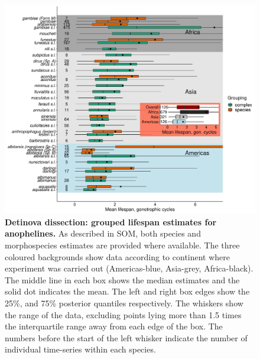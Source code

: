 \documentclass[12pt]{article}
\begin{document}
\begin{figure}[h]
	\centerline{\includegraphics[width=1\textwidth]{./Figure_files/detinova_lifespans_combined_parity_no_insecticide.pdf}}
	\caption{\textbf{Detinova dissection: grouped lifespan estimates for anophelines.} As described in SOM, both species and morphospecies estimates are provided where available. The three coloured backgrounds show data according to continent where experiment was carried out (Americas-blue, Asia-grey, Africa-black). The middle line in each box shows the median estimates and the solid dot indicates the mean. The left and right box edges show the 25\%, and 75\% posterior quantiles respectively. The whiskers show the range of the data, excluding points lying more than 1.5 times the interquartile range away from each edge of the box. The numbers before the start of the left whisker indicate the number of individual time-series within each species.}
	\label{fig:detinova_lifetimes}
\end{figure}
\end{document}
